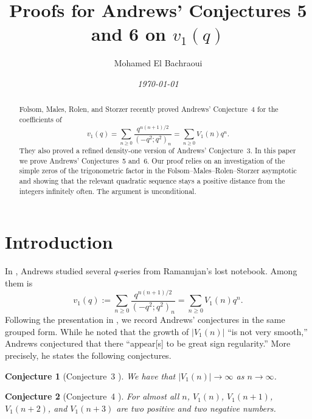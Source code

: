 \documentclass[reqno]{amsart}
\title[Proofs for Conjectures]{Proofs for Andrews' Conjectures 5 and 6 on $v_1(q)$}
\theoremstyle{definition}
\theoremstyle{plain}
\newtheorem*{aconjecture}{Conjecture}
\theoremstyle{remark}
\numberwithin{equation}{section}
\begin{document}
\author[M. El Bachraoui]{Mohamed El Bachraoui}
\address{Dept. Math. Sci,
United Arab Emirates University, PO Box 15551, Al-Ain, UAE}
%

\begin{abstract}
Folsom, Males, Rolen, and Storzer recently proved Andrews' Conjecture~4 for the coefficients of
\[
  v_1(q)=\sum_{n\ge 0}\frac{q^{n(n+1)/2}}{(-q^2;q^2)_n}=\sum_{n\ge 0}V_1(n)q^n.
\]
They also proved a refined density-one version of Andrews' Conjecture~3.
In this paper we prove Andrews' Conjectures~5 and~6.
Our proof relies on an investigation of the simple zeros of the trigonometric
factor in the Folsom--Males--Rolen--Storzer asymptotic
and showing that the relevant quadratic sequence stays a positive distance from the integers infinitely often. The argument is unconditional.
\end{abstract}
\date{\textit{\today}}
\maketitle

\section{Introduction}

In \cite{Andrews86}, Andrews studied several $q$-series from Ramanujan's lost notebook. Among them is
\begin{equation}\label{eq:v1-def}
  v_1(q):=\sum_{n\ge 0}\frac{q^{n(n+1)/2}}{(-q^2;q^2)_n}=\sum_{n\ge 0}V_1(n)q^n.
\end{equation}
Following the presentation in \cite[p.~2]{FMRS}, we record Andrews' conjectures \cite[p.~710]{Andrews86} in the same grouped form. While he noted that the growth of $|V_1(n)|$ ``is not very smooth,'' Andrews conjectured that there ``appear[s] to be great sign regularity.'' More precisely, he states the following conjectures.

\begin{aconjecture}[Conjecture~3 \cite{Andrews86}]
We have that $|V_1(n)|\to\infty$ as $n\to\infty$.
\end{aconjecture}

\begin{aconjecture}[Conjecture~4 \cite{Andrews86}]
For almost all $n$, $V_1(n)$, $V_1(n+1)$, $V_1(n+2)$, and $V_1(n+3)$ are two positive and two negative numbers.
\end{aconjecture}
\end{document}
